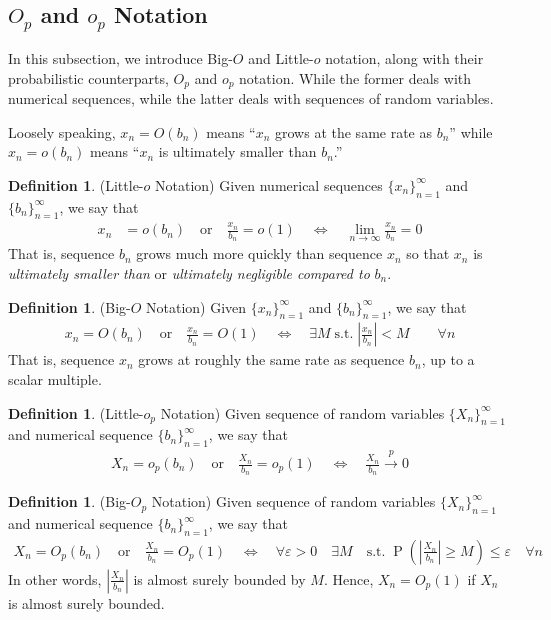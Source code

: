 \documentclass[12pt]{article}
\theoremstyle{plain}
\theoremstyle{definition}
\newtheorem{defn}[thm]{Definition}
\theoremstyle{remark}
\newcommand{\Prb}{\operatorname{P}}
\newcommand{\pto}{\xrightarrow{p}}
\newcommand{\limn}{\lim_{n\rightarrow\infty}}
\begin{document}
\clearpage
\subsection{$O_p$ and $o_p$ Notation}

In this subsection, we introduce Big-$O$ and Little-$o$ notation, along
with their probabilistic counterparts, $O_p$ and $o_p$ notation. While
the former deals with numerical sequences, while the latter deals with
sequences of random variables.

Loosely speaking, $x_n = O(b_n)$ means ``$x_n$ grows at the same
rate as $b_n$'' while $x_n=o(b_n)$ means ``$x_n$ is ultimately smaller
than $b_n$.''


\begin{defn}(Little-$o$ Notation)
Given numerical sequences $\{x_n\}_{n=1}^\infty$ and
$\{b_n\}_{n=1}^\infty$, we say that
\begin{align*}
  x_n &= o(b_n)
  \quad\text{or} \quad
  \frac{x_n}{b_n} = o(1)
  \quad \iff \quad
  \limn \frac{x_n}{b_n} = 0
\end{align*}
That is, sequence $b_n$ grows much more quickly than sequence $x_n$ so
that $x_n$ is \emph{ultimately smaller than} or
\emph{ultimately negligible compared to} $b_n$.
\end{defn}

\begin{defn}(Big-$O$ Notation)
Given $\{x_n\}_{n=1}^\infty$ and $\{b_n\}_{n=1}^\infty$, we say that
\begin{align*}
  x_n = O(b_n)
  \quad\text{or} \quad
  \frac{x_n}{b_n} = O(1)
  \quad \iff \quad
  \exists M \; \text{s.t.} \;
  \left\lvert
  \frac{x_n}{b_n}
  \right\rvert
  < M
  \qquad \forall n
\end{align*}
That is, sequence $x_n$ grows at roughly the same rate as sequence
$b_n$, up to a scalar multiple.
\end{defn}

\begin{defn}(Little-$o_p$ Notation)
Given sequence of random variables $\{X_n\}_{n=1}^\infty$ and numerical
sequence $\{b_n\}_{n=1}^\infty$, we say that
\begin{align*}
  X_n = o_p(b_n)
  \quad\text{or} \quad
  \frac{X_n}{b_n} = o_p(1)
  \quad \iff \quad
  \frac{X_n}{b_n} \pto 0
\end{align*}
\end{defn}

\begin{defn}(Big-$O_p$ Notation)
Given sequence of random variables $\{X_n\}_{n=1}^\infty$ and
numerical sequence $\{b_n\}_{n=1}^\infty$, we say that
\begin{align*}
  X_n = O_p(b_n)
  \quad\text{or} \quad
  \frac{X_n}{b_n} = O_p(1)
  \quad \iff \quad
  \forall \varepsilon>0 \quad
  \exists M\quad
  \text{s.t.} \;
  \Prb\left(
  \left\lvert
  \frac{X_n}{b_n}
  \right\rvert
   \geq M\right)
  \leq \varepsilon
  \quad \forall n
\end{align*}
In other words, $\left\lvert\frac{X_n}{b_n}\right\rvert$ is almost surely
bounded by $M$. Hence, $X_n=O_p(1)$ if $X_n$ is almost surely bounded.
\end{defn}
\end{document}
